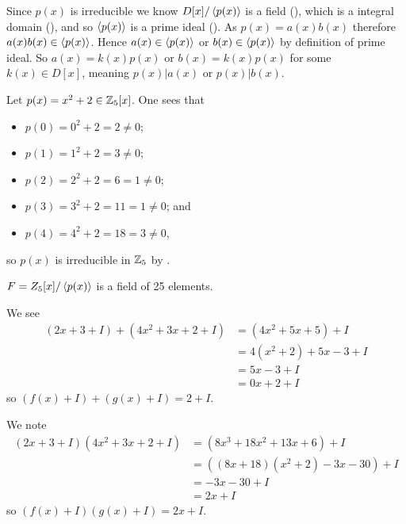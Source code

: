 \begin{questions}
    \item Since $p(x)$ is irreducible we know $D[x]/\left\langle p(x)\right\rangle$ is a field (), which is a integral domain (), and so $\left\langle p(x)\right\rangle$ is a prime ideal (). As $p(x) = a(x)b(x)$ therefore $a(x)b(x) \in \left\langle p(x)\right\rangle$. Hence $a(x) \in \left\langle p(x)\right\rangle$ or $b(x) \in \left\langle p(x)\right\rangle$ by definition of prime ideal. So $a(x) = k(x)p(x)$ or $b(x) = k(x)p(x)$ for some $k(x) \in D[x]$, meaning $p(x) \vert a(x)$ or $p(x) \vert b(x)$.
    
    \item \begin{partquestions}{\roman*}
        \item Let $p(x) = x^2 + 2 \in \mathbb{Z}_5[x]$. One sees that
        \begin{itemize}
            \item $p(0) = 0^2 + 2 = 2 \neq 0$;
            \item $p(1) = 1^2 + 2 = 3 \neq 0$;
            \item $p(2) = 2^2 + 2 = 6 = 1 \neq 0$;
            \item $p(3) = 3^2 + 2 = 11 = 1 \neq 0$; and
            \item $p(4) = 4^2 + 2 = 18 = 3 \neq 0$,
        \end{itemize}
        so $p(x)$ is irreducible in $\mathbb{Z}_5$ by .
        
        \item $F = Z_5[x]/\left\langle p(x)\right\rangle$ is a field of 25 elements.
        
        \item \begin{partquestions}{\alph*}
            \item We see
            \begin{align*}
                \left(2x+3 + I\right) + \left(4x^2+3x+2 + I\right) &= (4x^2+5x+5) + I\\
                &= 4(x^2+2) + 5x - 3 + I\\
                &= 5x - 3 + I\\
                &= 0x + 2 + I
            \end{align*}
            so $(f(x) + I) + (g(x) + I) = 2 + I$.
        
            \item We note
            \begin{align*}
                (2x+3 + I)(4x^2+3x+2 + I) &= (8 x^3 + 18 x^2 + 13 x + 6) + I\\
                &= \left((8x + 18)(x^2+2) - 3x - 30\right) + I\\
                &= -3x - 30 + I\\
                &= 2x + I
            \end{align*}
            so $(f(x) + I)(g(x) + I) = 2x + I$.
        \end{partquestions}
    \end{partquestions}
\end{questions}
